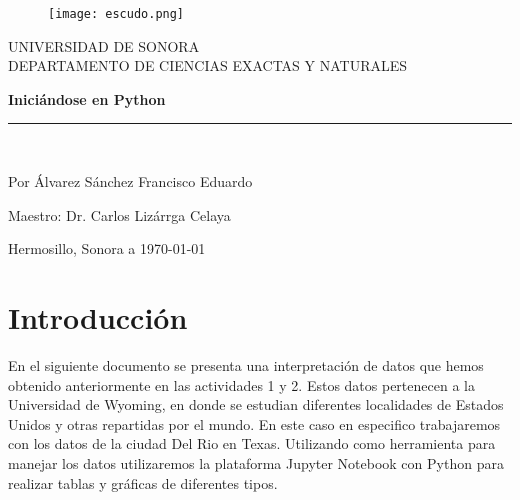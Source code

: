 \documentclass[12pt,letterpaper]{article}
\begin{document}
\begin{portada}\begin{center}
\vspace*{-1in}
\begin{figure}[htb]
\begin{center}
\texttt{[image: escudo.png]}
\end{center}
\end{figure}

UNIVERSIDAD DE SONORA\\
\vspace*{0.15in}
DEPARTAMENTO DE CIENCIAS EXACTAS Y NATURALES \\
\vspace*{0.6in}

\begin{Large}
\textbf{Iniciándose en Python} \\
\end{Large}
\vspace*{0.3in}

\vspace*{0.3in}
\rule{80mm}{0.1mm}\\
\vspace*{0.1in}
\begin{large}
Por Álvarez Sánchez Francisco Eduardo
\end{large}

\begin{large}
Maestro: Dr. Carlos Lizárrga Celaya \\
\end{large}
\vspace*{5cm}
\begin{large}
Hermosillo, Sonora a \today
\end{large}
\end{center}
\thispagestyle{empty}

\newpage
\tableofcontents
\cleardoublepage

\section{Introducción}
En el siguiente documento se presenta una interpretación de datos que hemos obtenido anteriormente en las actividades 1 y 2. Estos datos pertenecen a la Universidad de Wyoming, en donde se estudian diferentes localidades de Estados Unidos y otras repartidas por el mundo. En este caso en especifico trabajaremos con los datos de la ciudad Del Rio en Texas. 
Utilizando como herramienta para manejar los datos utilizaremos la plataforma Jupyter Notebook con Python para realizar tablas y gráficas de diferentes tipos. 
\newpage

\end{portada}
\end{document}
